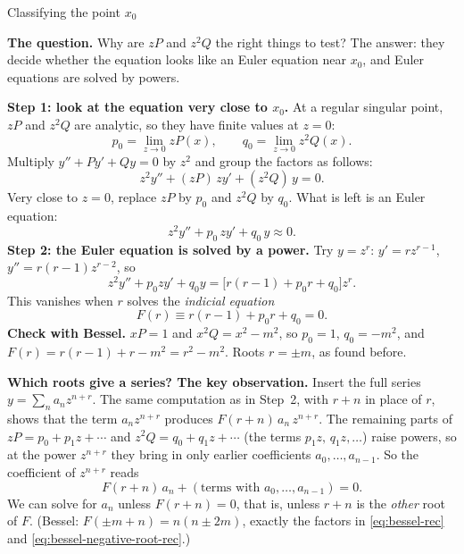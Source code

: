 \documentclass[11pt]{beamer}
\begin{document}
\begin{frame}[allowframebreaks=1.00]{Classifying the point $x_0$}
\footnotesize

\textbf{The question.} Why are \(zP\) and \(z^2Q\) the right things to test? The answer: they decide
whether the equation looks like an Euler equation near \(x_0\), and Euler equations are solved by
powers.

\textbf{Step 1: look at the equation very close to \(x_0\).} At a regular singular point, \(zP\) and \(z^2Q\)
are analytic, so they have finite values at \(z=0\):
\[
 p_0=\lim_{z\to0}zP(x),\qquad q_0=\lim_{z\to0}z^2Q(x).
\]
Multiply \(y''+Py'+Qy=0\) by \(z^2\) and group the factors as follows:
\[
 z^2y''+(zP)\,zy'+(z^2Q)\,y=0 .
\]
Very close to \(z=0\), replace \(zP\) by \(p_0\) and \(z^2Q\) by \(q_0\). What is left is an Euler equation:
\[
 z^2y''+p_0\,zy'+q_0\,y\approx0.
\]
\textbf{Step 2: the Euler equation is solved by a power.} Try \(y=z^r\): \(y'=rz^{r-1}\), \(y''=r(r-1)z^{r-2}\), so
\[
 z^2y''+p_0zy'+q_0y=\bigl[r(r-1)+p_0r+q_0\bigr]z^r .
\]
This vanishes when \(r\) solves the \emph{indicial equation}
\begin{equation}
 F(r)\equiv r(r-1)+p_0r+q_0=0.
 \label{eq:general-indicial}
\end{equation}
\textbf{Check with Bessel.} \(xP=1\) and \(x^2Q=x^2-m^2\), so \(p_0=1\), \(q_0=-m^2\), and
\(F(r)=r(r-1)+r-m^2=r^2-m^2\). Roots \(r=\pm m\), as found before.


\textbf{Which roots give a series? The key observation.} Insert the full series
\(y=\sum_na_nz^{n+r}\). The same computation as in Step~2, with \(r+n\) in place of \(r\), shows that the
term \(a_nz^{n+r}\) produces \(F(r+n)\,a_n\,z^{n+r}\). The remaining parts of \(zP=p_0+p_1z+\cdots\) and
\(z^2Q=q_0+q_1z+\cdots\) (the terms \(p_1z,\,q_1z,\dots\)) raise powers, so at the power \(z^{n+r}\) they bring in only earlier coefficients
\(a_0,\dots,a_{n-1}\). So the coefficient of \(z^{n+r}\) reads
\[
 F(r+n)\,a_n+(\text{terms with }a_0,\dots,a_{n-1})=0 .
\]
We can solve for \(a_n\) unless \(F(r+n)=0\), that is, unless \(r+n\) is the \emph{other} root of \(F\).
(Bessel: \(F(\pm m+n)=n(n\pm2m)\), exactly the factors in \eqref{eq:bessel-rec} and
\eqref{eq:bessel-negative-root-rec}.)



\end{frame}
\end{document}

